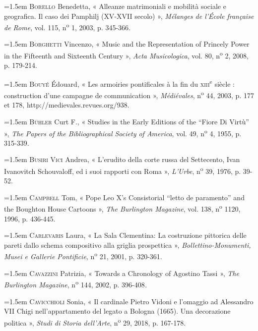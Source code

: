 \documentclass[12pt,twoside,openany]{book}
\newenvironment{PurhBibliography}
  {%
    \par
    \setlength{\parindent}{0pt}%
    \setlength{\leftskip}{0pt}%
  }
  {%
    \par
  }
\begin{document}
\begin{PurhBibliography}
\noindent\hangindent=1.5em \textsc{Borello} Benedetta, « Alleanze matrimoniali e mobilità sociale e geografica. Il caso dei Pamphilj (\textsc{XV}-\textsc{XVII} secolo) », \textit{Mélanges de l’École française de Rome}, vol. 115, n\textsuperscript{o} 1, 2003, p. 345-366.\par
\noindent\hangindent=1.5em \textsc{Borghetti} Vincenzo, « Music and the Representation of Princely Power in the Fifteenth and Sixteenth Century », \textit{Acta Musicologica}, vol. 80, n\textsuperscript{o} 2, 2008, p. 179‑214.\par
\noindent\hangindent=1.5em \textsc{Bouyé} Édouard, « Les armoiries pontificales à la fin du \textsc{xiii}\textsuperscript{e} siècle : construction d’une campagne de communication », \textit{Médiévales}, n\textsuperscript{o} 44, 2003, p. 177 et 178, http://medievales.revues.org/938.\par
\noindent\hangindent=1.5em \textsc{Bühler} Curt F., « Studies in the Early Editions of the “Fiore Di Virtù” », \textit{The Papers of the Bibliographical Society of America}, vol. 49, n\textsuperscript{o} 4, 1955, p. 315-339.\par
\noindent\hangindent=1.5em \textsc{Busiri Vici} Andrea, « L’erudito della corte russa del Settecento, Ivan Ivanovitch Schouvaloff, ed i suoi rapporti con Roma », \textit{L’Urbe}, n\textsuperscript{o} 39, 1976, p. 39-52.\par
\noindent\hangindent=1.5em \textsc{Campbell} Tom, « Pope Leo X’s Consistorial “letto de paramento” and the Boughton House Cartoons », \textit{The Burlington Magazine}, vol. 138, n\textsuperscript{o} 1120, 1996, p. 436-445.\par
\noindent\hangindent=1.5em \textsc{Carlevaris} Laura, « La Sala Clementina: La costruzione pittorica delle pareti dallo schema compositivo alla griglia prospettica », \textit{Bollettino-Monumenti, Musei e Gallerie Pontificie}, n\textsuperscript{o} 21, 2001, p. 320-361.\par
\noindent\hangindent=1.5em \textsc{Cavazzini} Patrizia, « Towards a Chronology of Agostino Tassi », \textit{The Burlington Magazine}, n\textsuperscript{o} 144, 2002, p. 396-408\textit{.}\par
\noindent\hangindent=1.5em \textsc{Cavicchioli} Sonia, « Il cardinale Pietro Vidoni e l’omaggio ad Alessandro \textsc{VII} Chigi nell’appartamento del legato a Bologna (1665). Una decorazione politica », \textit{Studi di Storia dell’Arte}, n\textsuperscript{o} 29, 2018, p. 167-178.\par

\end{PurhBibliography}
\end{document}
